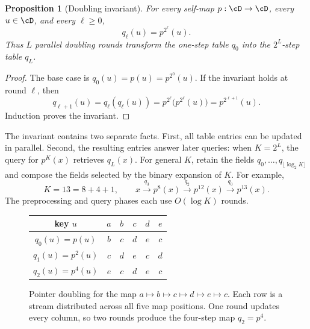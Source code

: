 \documentclass[11pt,twoside]{article}
\newtheorem{proposition}[theorem]{Proposition}
\theoremstyle{definition}
\theoremstyle{remark}
\begin{document}
\begin{proposition}[Doubling invariant]
\label{prop:doubling}
For every self-map $p:\cD\to\cD$, every $u\in\cD$, and every $\ell\geq0$,
\[
 q_\ell(u)=p^{2^\ell}(u).
\]
Thus $L$ parallel doubling rounds transform the one-step table $q_0$ into the
$2^L$-step table $q_L$.
\end{proposition}

\begin{proof}
The base case is $q_0(u)=p(u)=p^{2^0}(u)$. If the invariant holds at round
$\ell$, then
\[
 q_{\ell+1}(u)
 =q_\ell(q_\ell(u))
 =p^{2^\ell}\bigl(p^{2^\ell}(u)\bigr)
 =p^{2^{\ell+1}}(u).
\]
Induction proves the invariant.
\end{proof}

The invariant contains two separate facts. First, all table entries can be
updated in parallel. Second, the resulting entries answer later queries: when
$K=2^L$, the query for $p^K(x)$ retrieves $q_L(x)$. For general $K$, retain
the fields $q_0,\ldots,q_{\lfloor\log_2 K\rfloor}$ and compose the fields
selected by the binary expansion of $K$. For example,
\[
 K=13=8+4+1,
 \qquad
 x\xrightarrow{q_3}p^8(x)
  \xrightarrow{q_2}p^{12}(x)
  \xrightarrow{q_0}p^{13}(x).
\]
The preprocessing and query phases each use $O(\log K)$ rounds.

\begin{figure}[ht]
\centering
\begin{tabular}{c@{\qquad}ccccc}
\toprule
key $u$ & $a$ & $b$ & $c$ & $d$ & $e$\\
\midrule
$q_0(u)=p(u)$ & $b$ & $c$ & $d$ & $e$ & $c$\\
$q_1(u)=p^2(u)$ & $c$ & $d$ & $e$ & $c$ & $d$\\
$q_2(u)=p^4(u)$ & $e$ & $c$ & $d$ & $e$ & $c$\\
\bottomrule
\end{tabular}
\vspace{2mm}

\caption{Pointer doubling for the map
$a\mapsto b\mapsto c\mapsto d\mapsto e\mapsto c$. Each row is a stream
distributed across all five map positions. One round updates every column,
so two rounds produce the four-step map $q_2=p^4$.}
\label{fig:pointer-doubling}
\end{figure}
\end{document}
